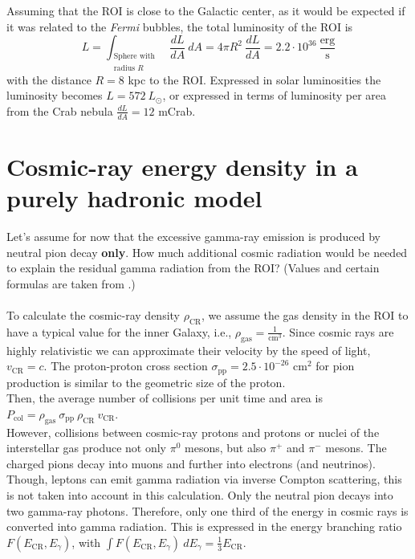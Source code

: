 \documentclass[a4paper]{article}
\begin{document}
Assuming that the ROI is close to the Galactic center, as it would be expected if it was related to the \textit{Fermi} bubbles, the total luminosity of the ROI is
\begin{equation}
\label{eq_L}
L = \int_{\substack{\text{Sphere with} \\ \text{radius }R}}\ \frac{dL}{dA}\ dA = 4 \pi R^2\ \frac{dL}{dA} = 2.2 \cdot 10^{36}\ \frac{\text{erg}}{\text{s}}
\end{equation}
with the distance $R = 8$ kpc to the ROI. Expressed in solar luminosities the luminosity becomes $L = 572\ L_\odot$, or expressed in terms of luminosity per area from the Crab nebula $\frac{dL}{dA} = 12 $ mCrab. 


\section{Cosmic-ray energy density in a purely hadronic model}
Let's assume for now that the excessive gamma-ray emission is produced by neutral pion decay \textbf{only}. How much additional cosmic radiation would be needed to explain the residual gamma radiation from the ROI? (Values and certain formulas are taken from \cite{Longair}.)\\
\\
To calculate the cosmic-ray density $\rho_{\text{CR}}$, we assume the gas density in the ROI to have a typical value for the inner Galaxy, i.e., $\rho_\text{gas} = \frac{1}{\text{cm}^3}$. Since cosmic rays are highly relativistic we can approximate their velocity by the speed of light, $v_\text{CR} = c$. The proton-proton cross section $\sigma_\text{pp} = 2.5 \cdot 10^{-26}$ cm$^2$ for pion production is similar to the geometric size of the proton.\\
Then, the average number of collisions per unit time and area is $P_\text{col} = \rho_{\text{gas}}\ \sigma_{\text{pp}}\ \rho_{\text{CR}}\ v_{\text{CR}}$.\\
However, collisions between cosmic-ray protons and protons or nuclei of the interstellar gas produce not only $\pi^0$ mesons, but also $\pi^+$ and $\pi^-$ mesons. The charged pions decay into muons and further into electrons (and neutrinos). Though, leptons can emit gamma radiation via inverse Compton scattering, this is not taken into account in this calculation. Only the neutral pion decays into two gamma-ray photons. Therefore, only one third of the energy in cosmic rays is converted into gamma radiation. This is expressed in the energy branching ratio $F(E_{\text{CR}}, E_\gamma)$, with $\int F(E_{\text{CR}}, E_\gamma)\ dE_\gamma = \frac{1}{3}E_\text{CR}$.
\end{document}
